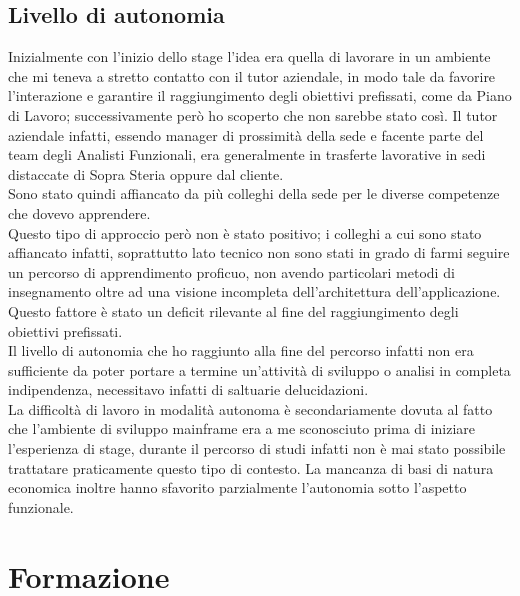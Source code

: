 \subsection{Livello di autonomia}

	Inizialmente con l'inizio dello stage l'idea era quella di lavorare in un ambiente che mi teneva a stretto contatto con il tutor aziendale, in modo tale da favorire l'interazione e garantire il raggiungimento degli obiettivi prefissati, come da Piano di Lavoro; successivamente però ho scoperto che non sarebbe stato così. Il tutor aziendale infatti, essendo manager di prossimità della sede e facente parte del team degli Analisti Funzionali, era generalmente in trasferte lavorative in sedi distaccate di Sopra Steria oppure dal cliente.\\
	
	Sono stato quindi affiancato da più colleghi della sede per le diverse competenze che dovevo apprendere.\\
	
	Questo tipo di approccio però non è stato positivo; i colleghi a cui sono stato affiancato infatti, soprattutto lato tecnico non sono stati in grado di farmi seguire un percorso di apprendimento proficuo, non avendo particolari metodi di insegnamento oltre ad una visione incompleta dell'architettura dell'applicazione.\\
	
	Questo fattore è stato un deficit rilevante al fine del raggiungimento degli obiettivi prefissati.\\

	Il livello di autonomia che ho raggiunto alla fine del percorso infatti non era sufficiente da poter portare a termine un'attività di sviluppo o analisi in completa indipendenza, necessitavo infatti di saltuarie delucidazioni.\\
	
	La difficoltà di lavoro in modalità autonoma è secondariamente dovuta al fatto che l'ambiente di sviluppo mainframe era a me sconosciuto prima di iniziare l'esperienza di stage, durante il percorso di studi infatti non è mai stato possibile trattatare praticamente questo tipo di contesto. La mancanza di basi di natura economica inoltre hanno sfavorito parzialmente l'autonomia sotto l'aspetto funzionale.

\section{Formazione}


